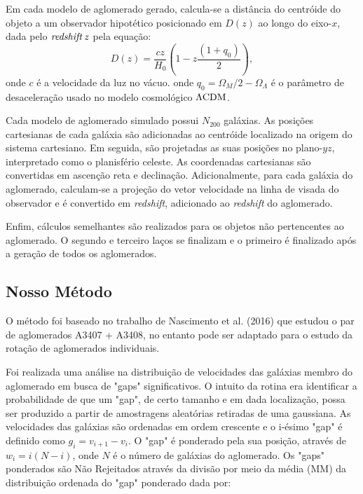 Em cada modelo de aglomerado gerado, calcula-se a dist\^ancia do centr\'oide do objeto a um observador hipot\'etico posicionado em $D(z)$ ao longo do eixo-$x$, dada pelo $\it redshift \, z$ pela equa\c c\~ao: 
\begin{equation}
D(z) = \frac{c z}{H_0} \left(1-z\frac{(1+q_0)}{2}   \right), 	
\label{distanciaaglomerado}
\end{equation}
onde $c$ \'e a velocidade da luz no v\'acuo.
onde $q_0 = \Omega_{M}/2 - \Omega_{\Lambda}$ \'e o par\^ametro de desacelera\c c\~ao usado no modelo cosmol\'ogico ${\rm \Lambda CDM}$.

Cada modelo de aglomerado simulado possui $N_{200}$ gal\'axias. As posi\c c\~oes cartesianas de cada gal\'axia s\~ao adicionadas ao centr\'oide localizado na origem do sistema cartesiano. Em seguida, s\~ao projetadas as suas posi\c c\~oes no plano-$yz$, interpretado como o planisf\'erio celeste. As coordenadas cartesianas s\~ao convertidas em ascen\c c\~ao reta e declina\c c\~ao. Adicionalmente, para cada gal\'axia do aglomerado, calculam-se a proje\c c\~ao do vetor velocidade na linha de visada do observador e \'e convertido em {\it redshift}, adicionado ao {\it redshift} do aglomerado. 

Enfim, c\'alculos semelhantes s\~ao realizados para os objetos n\~ao pertencentes ao aglomerado. O segundo e terceiro la\c cos se finalizam e o primeiro \'e finalizado ap\'os a geração de todos os aglomerados.


\subsection{Nosso Método}
O método foi baseado no trabalho de Nascimento et al. (2016) que estudou o par de aglomerados A3407 + A3408, no entanto pode ser adaptado para o estudo da rotação de aglomerados individuais. 

Foi realizada uma análise na distribuição de velocidades das galáxias membro do aglomerado em busca de "gaps" significativos. O intuito da rotina era identificar a probabilidade de que um "gap",  de certo tamanho e em dada localização, possa ser produzido a partir de amostragens aleatórias retiradas de uma gaussiana. As velocidades das galáxias são ordenadas em ordem crescente e o i-ésimo "gap" é definido como $g_i = v_{i+1} - v_i$. O "gap" é ponderado pela sua posição, através de $w_i=i(N-i)$, onde $N$ é o número de galáxias do aglomerado. Os "gaps" ponderados são Não Rejeitados através da divisão por meio da média (MM) da distribuição ordenada do "gap" ponderado dada por: 

